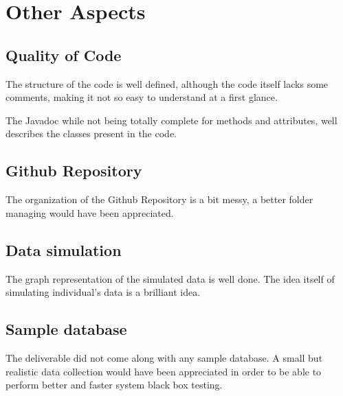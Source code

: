 \section{Other Aspects}



\subsection{Quality of Code}

The structure of the code is well defined, although the code itself lacks some comments, making it not so easy to understand at a first glance. 

The Javadoc while not being totally complete for methods and attributes, well describes the classes present in the code.


\subsection{Github Repository}

The organization of the Github Repository is a bit messy, a better folder managing would have been appreciated.


\subsection{Data simulation}

The graph representation of the simulated data is well done. The idea itself of simulating individual's data is a brilliant idea.

\subsection{Sample database}

The deliverable did not come along with any sample database.
A small but realistic data collection would have been appreciated in order to be able to perform better and faster system black box testing.


